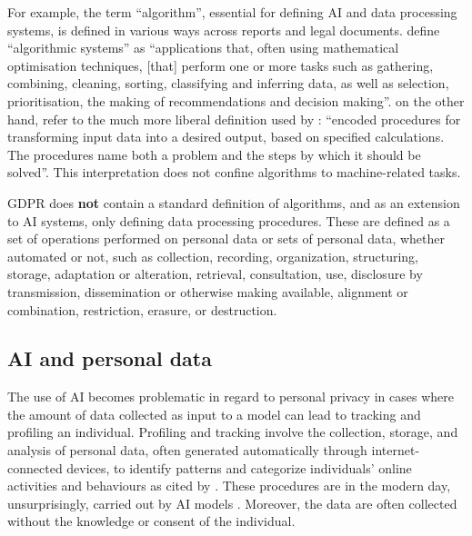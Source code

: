 \documentclass{article}
\begin{document}
For example, the term “algorithm”, essential for defining AI and data processing systems, is defined in various ways across reports and legal documents. \cite{cmrec2020} define “algorithmic systems” as “applications that, often using mathematical optimisation techniques, [that] perform one or more tasks such as gathering, combining, cleaning, sorting, classifying and inferring data, as well as selection, prioritisation, the making of recommendations and decision making”. \cite{wagner2018} on the other hand, refer to the much more liberal definition used by \cite{gillespie2014}: “encoded procedures for transforming input data into a desired output, based on specified calculations. The procedures name both a problem and the steps by which it should be solved”. This interpretation does not confine algorithms to machine-related tasks.

GDPR does \textbf{not} contain a standard definition of algorithms, and as an extension to AI systems, only defining data processing procedures. These are defined as a set of operations performed on personal data or sets of personal data, whether automated or not, such as collection, recording, organization, structuring, storage, adaptation or alteration, retrieval, consultation, use, disclosure by transmission, dissemination or otherwise making available, alignment or combination, restriction, erasure, or destruction.


\subsection{AI and personal data}
\label{ssec:privacy}

The use of AI becomes problematic in regard to personal privacy in cases where the amount of data collected as input to a model can lead to tracking and profiling an individual. Profiling and tracking involve the collection, storage, and analysis of personal data, often generated automatically through internet-connected devices, to identify patterns and categorize individuals' online activities and behaviours \cite{dinant, infocomm2022} as cited by \cite{mitrou}. These procedures are in the modern day, unsurprisingly, carried out by AI models \cite{kamarinou2016}. Moreover, the data are often collected without the knowledge or consent of the individual. %
\end{document}
